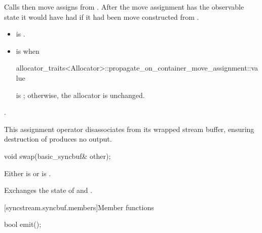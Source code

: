 \begin{itemdescr}
\pnum
\effects
Calls  then
move assigns from .
After the move assignment 
has the observable state it would have had if
it had been move constructed from .

\pnum
\ensures
\begin{itemize}
\item
{} is .
\item
{} is  when
\begin{codeblock}
allocator_traits<Allocator>::propagate_on_container_move_assignment::value
\end{codeblock}
is ; otherwise, the allocator is unchanged.
\end{itemize}

\pnum
\returns
{}.

\pnum
\remarks
This assignment operator disassociates 
from its wrapped stream buffer,
ensuring destruction of  produces no output.
\end{itemdescr}

%
\begin{itemdecl}
void swap(basic_syncbuf& other);
\end{itemdecl}

\begin{itemdescr}
\pnum
\expects
Either
is 
or
is .

\pnum
\effects
Exchanges the state of  and .
\end{itemdescr}

[syncstream.syncbuf.members]{Member functions}

%
\begin{itemdecl}
bool emit();
\end{itemdecl}

